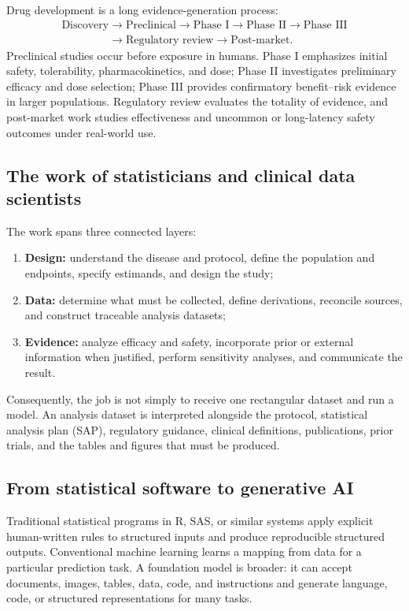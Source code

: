 \documentclass[12pt,oneside]{book}
\numberwithin{equation}{section}
\theoremstyle{definition}
\theoremstyle{plain}
\theoremstyle{remark}
\begin{document}
Drug development is a long evidence-generation process:
\[
\begin{gathered}
\text{Discovery}\rightarrow\text{Preclinical}\rightarrow
\text{Phase I}\rightarrow\text{Phase II}\rightarrow\text{Phase III}\\
\phantom{\text{Discovery}}\longrightarrow
\text{Regulatory review}\rightarrow\text{Post-market}.
\end{gathered}
\]
Preclinical studies occur before exposure in humans.  Phase I emphasizes
initial safety, tolerability, pharmacokinetics, and dose; Phase II investigates
preliminary efficacy and dose selection; Phase III provides confirmatory
benefit--risk evidence in larger populations.  Regulatory review evaluates the
totality of evidence, and post-market work studies effectiveness and uncommon
or long-latency safety outcomes under real-world use.

\subsection{The work of statisticians and clinical data scientists}

The work spans three connected layers:
\begin{enumerate}
    \item \textbf{Design:} understand the disease and protocol, define the
    population and endpoints, specify estimands, and design the study;
    \item \textbf{Data:} determine what must be collected, define derivations,
    reconcile sources, and construct traceable analysis datasets;
    \item \textbf{Evidence:} analyze efficacy and safety, incorporate prior or
    external information when justified, perform sensitivity analyses, and
    communicate the result.
\end{enumerate}
Consequently, the job is not simply to receive one rectangular dataset and run
a model.  An analysis dataset is interpreted alongside the protocol,
statistical analysis plan (SAP), regulatory guidance, clinical definitions,
publications, prior trials, and the tables and figures that must be produced.

\subsection{From statistical software to generative AI}

Traditional statistical programs in R, SAS, or similar systems apply explicit
human-written rules to structured inputs and produce reproducible structured
outputs.  Conventional machine learning learns a mapping from data for a
particular prediction task.  A foundation model is broader: it can accept
documents, images, tables, data, code, and instructions and generate language,
code, or structured representations for many tasks.
\end{document}
